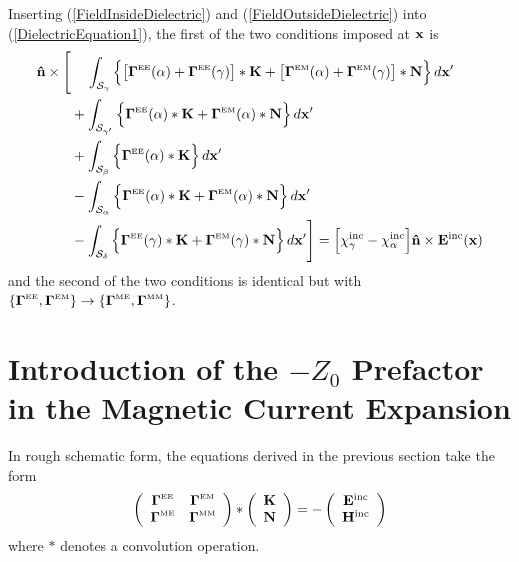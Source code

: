 \documentclass[dvips,letterpaper]{article}
\newcommand{\BG}{\boldsymbol{\Gamma}}
\begin{document}
Inserting (\ref{FieldInsideDielectric}) and 
(\ref{FieldOutsideDielectric}) into (\ref{DielectricEquation1}), 
the first of the two conditions imposed at $\mathbf{x}$ is
\begin{align}
\vbhat{n}\times
 \Bigg[  &\hphantom{+}\,\,\int_{\mathcal{S_\gamma}}
           \Big\{ \big[\BG\supt{EE}(\alpha) + \BG\supt{EE}(\gamma)\big]
                   *\vb K 
                + \big[\BG\supt{EM}(\alpha) + \BG\supt{EM}(\gamma)\big]
                   *\vb N 
           \Big\} \, d\vb x^\prime
\nn
         &+\int_{\mathcal{S}_{\gamma^\prime}}
           \Big\{ \BG\supt{EE}(\alpha)*\vb K 
                 +\BG\supt{EM}(\alpha)*\vb N 
           \Big\} \, d\vb x^\prime
\nn
         &+\int_{\mathcal{S_\beta}} 
           \Big\{ \BG\supt{EE}(\alpha)*\vb K \Big\} \, d\vb x^\prime
\nn
         &-\int_{\mathcal{S_\alpha}}
           \Big\{ \BG\supt{EE}(\alpha)*\vb K 
                 +\BG\supt{EM}(\alpha)*\vb N 
           \Big\} \, d\vb x^\prime
\nn
         &-\int_{\mathcal{S_\delta}} 
           \Big\{ \BG\supt{EE}(\gamma)*\vb K 
                 +\BG\supt{EM}(\gamma)*\vb N 
           \Big\} \, d\vb x^\prime
 \Bigg]
= \Big[\chi\sups{inc}_\gamma - \chi\sups{inc}_\alpha\Big] 
   \vbhat{n}\times \vb E\sups{inc}(\vb x)
\label{DielectricEquationBreakdown}
\end{align}
and the second of the two conditions is identical 
but with 
$\{\BG\supt{EE}, \BG\supt{EM}\} \to 
 \{\BG\supt{ME}, \BG\supt{MM}\}$.

\newpage
\section{Introduction of the $-Z_0$ Prefactor in the 
         Magnetic Current Expansion} 

In rough schematic form, the equations derived in the 
previous section take the form 
$$ \left( \begin{array}{cc}
   \BG\supt{EE} & \BG\supt{EM} \\
   \BG\supt{ME} & \BG\supt{MM} \\
   \end{array} \right)
   *
   \left( \begin{array}{c} \vb K \\  \vb N\end{array}\right)
   = 
   -
   \left( \begin{array}{c}
   \vb E\sups{inc} \\
   \vb H\sups{inc} \\
   \end{array}\right)
$$
where $*$ denotes a convolution operation.
\end{document}
